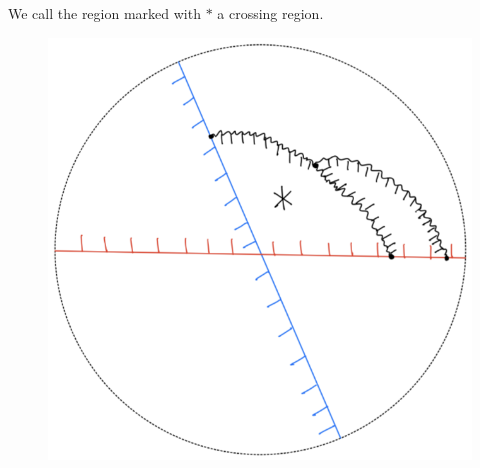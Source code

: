 \begin{definition}
\begin{enumerate}[label = (\roman*)]
\begin{itemize}
\begin{figure}[H]
    \caption{}
    \label{fig:your-label}
\end{figure}
We call the region marked with $*$ a crossing region.
\begin{figure}[H] 
    \centering
    \includegraphics[scale = 0.55]{diagrams/local_systems_on_as_diagrams/8.png} 
    \caption{}
    \label{fig:your-label}
\end{figure}
\end{itemize}


\end{enumerate}
\end{definition}
